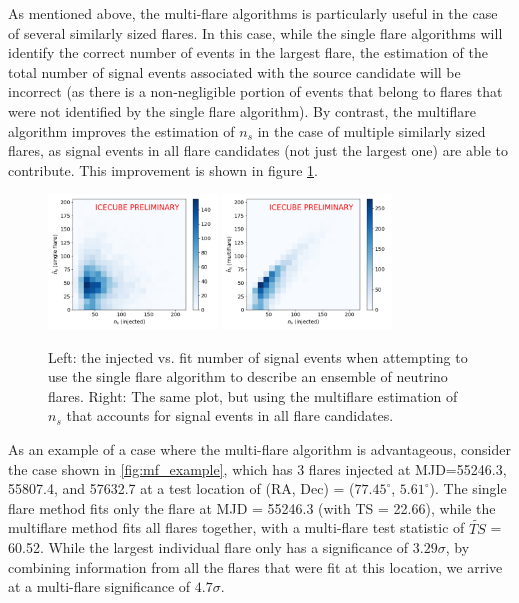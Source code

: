 As mentioned above, the multi-flare algorithms is particularly useful in the case of several similarly sized flares. In this case, while the single flare algorithms will identify the correct number of events in the largest flare, the estimation of the total number of signal events associated with the source candidate will be incorrect (as there is a non-negligible portion of events that belong to flares that were not identified by the single flare algorithm). By contrast, the multiflare algorithm improves the estimation of $n_s$ in the case of multiple similarly sized flares, as signal events in all flare candidates (not just the largest one) are able to contribute. This improvement is shown in figure \ref{fig:persrc_nsfit}.

\begin{figure}[h]
\centering
\includegraphics[width=0.4\textwidth]{figs/500px-Ns_singleflare.png}
\includegraphics[width=0.4\textwidth]{figs/500px-Ns_multiflare.png}
\caption{Left: the injected vs. fit number of signal events when attempting to use the single flare algorithm to describe an ensemble of neutrino flares. Right: The same plot, but using the multiflare estimation of $n_s$ that accounts for signal events in all flare candidates.}
\label{fig:persrc_nsfit}
\end{figure}

As an example of a case where the multi-flare algorithm is advantageous, consider the case shown in \ref{fig:mf_example}, which has 3 flares injected at MJD=55246.3, 55807.4, and 57632.7 at a test location of (RA, Dec) = ($77.45^{\circ}$, $5.61^{\circ}$). The single flare method fits only the flare at MJD = 55246.3 (with TS = 22.66), while the multiflare method fits all flares together, with a multi-flare test statistic of $\widetilde{TS}$ = 60.52. While the largest individual flare only has a significance of $3.29 \sigma$, by combining information from all the flares that were fit at this location, we arrive at a multi-flare significance of $4.7 \sigma$. 

